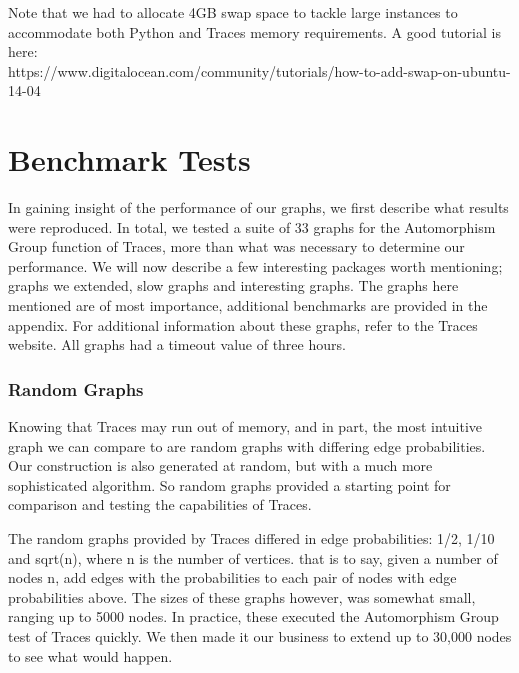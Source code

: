 Note that we had to allocate 4GB swap space to tackle large instances to accommodate both Python and Traces memory requirements. A good tutorial is here:\\ https://www.digitalocean.com/community/tutorials/how-to-add-swap-on-ubuntu-14-04

\section{Benchmark Tests}
In gaining insight of the performance of our graphs, we first describe what results were reproduced. In total, we tested a suite of 33 graphs for the Automorphism Group function of Traces, more than what was necessary to determine our performance. We will now describe a few interesting packages worth mentioning; graphs we extended, slow graphs and interesting graphs. The graphs here mentioned are of most importance, additional benchmarks are provided in the appendix. For additional information about these graphs, refer to the Traces website. All graphs had a timeout value of three hours.

\subsubsection{Random Graphs}
Knowing that Traces may run out of memory, and in part, the most intuitive graph we can compare to are random graphs with differing edge probabilities. Our construction is also generated at random, but with a much more sophisticated algorithm. So random graphs provided a starting point for comparison and testing the capabilities of Traces.
\par
The random graphs provided by Traces differed in edge probabilities: 1/2, 1/10 and sqrt(n), where n is the number of vertices. that is to say, given a number of nodes n, add edges with the probabilities to each pair of nodes with edge probabilities above. The sizes of these graphs however, was somewhat small, ranging up to 5000 nodes. In practice, these executed the Automorphism Group test of Traces quickly. We then made it our business to extend up to 30,000 nodes to see what would happen.

